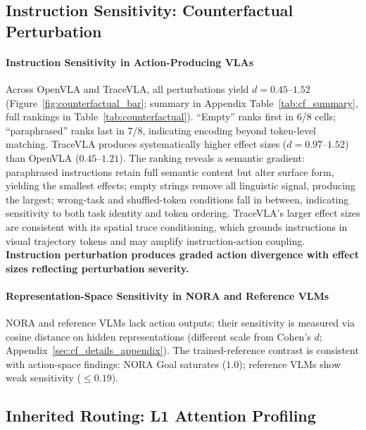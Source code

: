 \subsection{Instruction Sensitivity: Counterfactual Perturbation}
\label{sec:cf_sensitivity}

\paragraph{Instruction Sensitivity in Action-Producing VLAs}
Across OpenVLA and TraceVLA, all perturbations yield $d = 0.45$--$1.52$ (Figure~\ref{fig:counterfactual_bar}; summary in Appendix Table~\ref{tab:cf_summary}, full rankings in Table~\ref{tab:counterfactual}).
``Empty'' ranks first in 6/8 cells; ``paraphrased'' ranks last in 7/8, indicating encoding beyond token-level matching.
TraceVLA produces systematically higher effect sizes ($d = 0.97$--$1.52$) than OpenVLA ($0.45$--$1.21$).
The ranking reveals a semantic gradient: paraphrased instructions retain full semantic content but alter surface form, yielding the smallest effects; empty strings remove all linguistic signal, producing the largest; wrong-task and shuffled-token conditions fall in between, indicating sensitivity to both task identity and token ordering.
TraceVLA's larger effect sizes are consistent with its spatial trace conditioning, which grounds instructions in visual trajectory tokens and may amplify instruction-action coupling.
\textbf{Instruction perturbation produces graded action divergence with effect sizes reflecting perturbation severity.}

\paragraph{Representation-Space Sensitivity in NORA and Reference VLMs}
\label{sec:cf_repr}

NORA and reference VLMs lack action outputs; their sensitivity is measured via cosine distance on hidden representations (different scale from Cohen's $d$; Appendix~\ref{sec:cf_details_appendix}).
The trained-reference contrast is consistent with action-space findings: NORA Goal saturates ($1.0$); reference VLMs show weak sensitivity ($\leq 0.19$).

\subsection{Inherited Routing: L1 Attention Profiling}
\label{sec:l1_priors}

